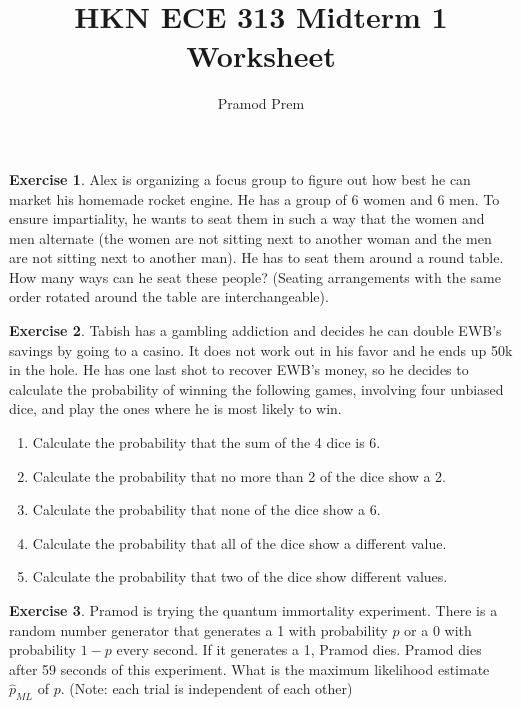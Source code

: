 \documentclass[12pt]{amsart}
\title{HKN ECE 313 Midterm 1 Worksheet}
\author{Pramod Prem}
\theoremstyle{definition}
\newtheorem{exercise}{Exercise}
\numberwithin{equation}{section}
\theoremstyle{plain}
\begin{document}
\maketitle

\begin{exercise}
\newline
Alex is organizing a focus group to figure out how best he can market his homemade rocket engine. He has a group of 6 women and 6 men. To ensure impartiality, he wants to seat them in such a way that the women and men alternate (the women are not sitting next to another woman and the men are not sitting next to another man). He has to seat them around a round table. How many ways can he seat these people? (Seating arrangements with the same order rotated around the table are interchangeable).
\end{exercise}

\begin{exercise}
\newline
Tabish has a gambling addiction and decides he can double EWB's savings by going to a casino. It does not work out in his favor and he ends up 50k in the hole. He has one last shot to recover EWB's money, so he decides to calculate the probability of winning the following games, involving four unbiased dice, and play the ones where he is most likely to win.
\begin{enumerate}[label=\Alph*.]
    \item Calculate the probability that the sum of the 4 dice is 6.
    \item Calculate the probability that no more than 2 of the dice show a 2.
    \item Calculate the probability that none of the dice show a 6.
    \item Calculate the probability that all of the dice show a different value.
    \item Calculate the probability that two of the dice show different values.
\end{enumerate}
\end{exercise}

\begin{exercise}
    Pramod is trying the quantum immortality experiment. There is a random number generator that generates a 1 with probability $p$ or a 0 with probability $1-p$ every second. If it generates a 1, Pramod dies. Pramod dies after 59 seconds of this experiment. What is the maximum likelihood estimate $\hat{p}_{ML}$ of $p$. (Note: each trial is independent of each other)
\end{exercise}
\end{document}
